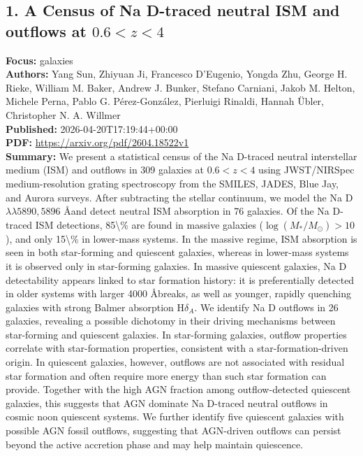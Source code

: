\documentclass[11pt]{article}
\begin{document}
\subsection*{1. A Census of Na D-traced neutral ISM and outflows at $0.6<z<4$}
\textbf{Focus:} galaxies\\
\textbf{Authors:} Yang Sun, Zhiyuan Ji, Francesco D'Eugenio, Yongda Zhu, George H. Rieke, William M. Baker, Andrew J. Bunker, Stefano Carniani, Jakob M. Helton, Michele Perna, Pablo G. Pérez-González, Pierluigi Rinaldi, Hannah Übler, Christopher N. A. Willmer\\
\textbf{Published:} 2026-04-20T17:19:44+00:00\\
\textbf{PDF:} \href{https://arxiv.org/pdf/2604.18522v1}{https://arxiv.org/pdf/2604.18522v1}\\
\textbf{Summary:}
We present a statistical census of the Na D-traced neutral interstellar medium (ISM) and outflows in 309 galaxies at $0.6<z<4$ using JWST/NIRSpec medium-resolution grating spectroscopy from the SMILES, JADES, Blue Jay, and Aurora surveys. After subtracting the stellar continuum, we model the Na D $\lambda \lambda 5890, 5896$ Åand detect neutral ISM absorption in 76 galaxies. Of the Na D-traced ISM detections, 85\textbackslash{}\% are found in massive galaxies ($\log(M_*/M_\odot)>10$), and only 15\textbackslash{}\% in lower-mass systems. In the massive regime, ISM absorption is seen in both star-forming and quiescent galaxies, whereas in lower-mass systems it is observed only in star-forming galaxies. In massive quiescent galaxies, Na D detectability appears linked to star formation history: it is preferentially detected in older systems with larger 4000 Åbreaks, as well as younger, rapidly quenching galaxies with strong Balmer absorption H$\delta _A$. We identify Na D outflows in 26 galaxies, revealing a possible dichotomy in their driving mechanisms between star-forming and quiescent galaxies. In star-forming galaxies, outflow properties correlate with star-formation properties, consistent with a star-formation-driven origin. In quiescent galaxies, however, outflows are not associated with residual star formation and often require more energy than such star formation can provide. Together with the high AGN fraction among outflow-detected quiescent galaxies, this suggests that AGN dominate Na D-traced neutral outflows in cosmic noon quiescent systems. We further identify five quiescent galaxies with possible AGN fossil outflows, suggesting that AGN-driven outflows can persist beyond the active accretion phase and may help maintain quiescence.
\end{document}
